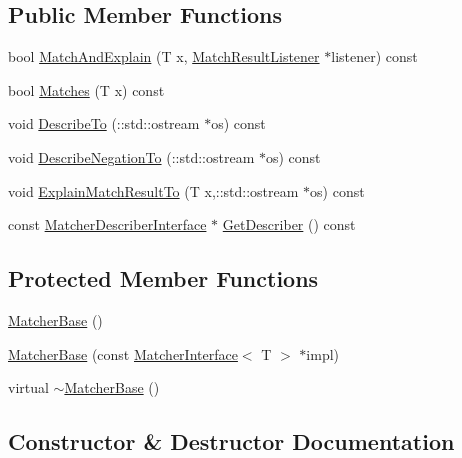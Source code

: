 \subsection*{Public Member Functions}
\begin{DoxyCompactItemize}
\item 
bool \hyperlink{classtesting_1_1internal_1_1MatcherBase_ae3f5f3150a95cafb1c2ab7c864a42e65}{Match\+And\+Explain} (T x, \hyperlink{classtesting_1_1MatchResultListener}{Match\+Result\+Listener} $\ast$listener) const 
\item 
bool \hyperlink{classtesting_1_1internal_1_1MatcherBase_a105a9dae7afecee8898db8ad1887b0db}{Matches} (T x) const 
\item 
void \hyperlink{classtesting_1_1internal_1_1MatcherBase_afcb24e7d1ff27e147e0e607d2a122467}{Describe\+To} (\+::std\+::ostream $\ast$os) const 
\item 
void \hyperlink{classtesting_1_1internal_1_1MatcherBase_a47cc840bc783fc0ceafbfb68d0ea5758}{Describe\+Negation\+To} (\+::std\+::ostream $\ast$os) const 
\item 
void \hyperlink{classtesting_1_1internal_1_1MatcherBase_a3a4c25a6e6c658b1fd52fd42c2fbd690}{Explain\+Match\+Result\+To} (T x,\+::std\+::ostream $\ast$os) const 
\item 
const \hyperlink{classtesting_1_1MatcherDescriberInterface}{Matcher\+Describer\+Interface} $\ast$ \hyperlink{classtesting_1_1internal_1_1MatcherBase_a716ce3d9f89cb63f9911d56f307b6ff6}{Get\+Describer} () const 
\end{DoxyCompactItemize}
\subsection*{Protected Member Functions}
\begin{DoxyCompactItemize}
\item 
\hyperlink{classtesting_1_1internal_1_1MatcherBase_a7214ff6bbe5d13d5ee01fc09c7114e1d}{Matcher\+Base} ()
\item 
\hyperlink{classtesting_1_1internal_1_1MatcherBase_aed3e080f12ea7bde535ddf02b6f66922}{Matcher\+Base} (const \hyperlink{classtesting_1_1MatcherInterface}{Matcher\+Interface}$<$ T $>$ $\ast$impl)
\item 
virtual \hyperlink{classtesting_1_1internal_1_1MatcherBase_a6f8cbfaa5fa9205f297d84fb1741d9c3}{$\sim$\+Matcher\+Base} ()
\end{DoxyCompactItemize}


\subsection{Constructor \& Destructor Documentation}

